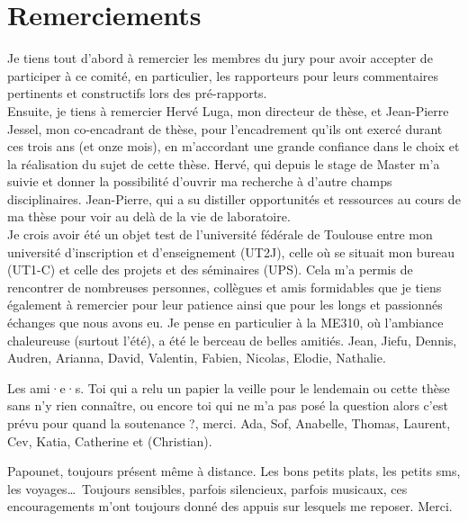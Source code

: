 
\thispagestyle{empty}
\section*{Remerciements}
\adjustmtc

Je tiens tout d'abord à remercier les membres du jury pour avoir accepter de 
participer à ce comité, en particulier, les rapporteurs pour leurs commentaires 
pertinents et constructifs lors des pré-rapports.
\\

Ensuite, je tiens à remercier Hervé Luga, mon directeur de thèse, et Jean-Pierre 
Jessel, mon co-encadrant de thèse, pour l'encadrement qu'ils ont exercé durant 
ces trois ans (et onze mois), en m'accordant une grande confiance dans le choix 
et la réalisation du sujet de cette thèse. 
Hervé, qui depuis le stage de Master m'a suivie et donner la possibilité d'ouvrir 
ma recherche à d'autre champs disciplinaires. Jean-Pierre, qui a su distiller 
opportunités et ressources au cours de ma thèse pour voir au delà de la vie de 
laboratoire.
\\

Je crois avoir été un objet test de l'université fédérale de Toulouse entre mon 
université d'inscription et d'enseignement (UT2J), celle où se situait mon bureau 
(UT1-C) et celle des projets et des séminaires (UPS). Cela m'a permis de 
rencontrer de nombreuses personnes, collègues et amis formidables que je tiens 
également à remercier pour leur patience ainsi que pour les longs et passionnés 
échanges que nous avons eu. Je pense en particulier à la ME310, où l'ambiance 
chaleureuse 
(surtout l'été), a été le berceau de belles amitiés. {\color{white} Jean, Jiefu, 
Dennis, Audren, Arianna, David, Valentin, Fabien, Nicolas, Elodie, Nathalie.}

Les ami·e·s. Toi qui a relu un papier la veille pour le lendemain ou cette 
thèse sans n'y rien connaître, ou encore toi qui ne m'a pas posé la question \og 
alors c'est 
prévu pour quand la soutenance ?\fg{}, merci. {\color{white} Ada, Sof, Anabelle, 
Thomas, 
Laurent, Cev, Katia, Catherine et (Christian).}

Papounet, toujours présent même à distance. Les bons petits plats, les 
petits sms, les voyages\dots~Toujours sensibles, parfois 
silencieux, parfois musicaux, ces encouragements m'ont toujours donné des 
appuis sur lesquels me reposer. Merci.\\

